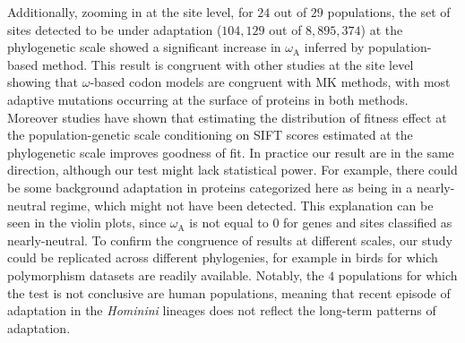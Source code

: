 \documentclass{article}
\begin{document}
    Additionally, zooming in at the site level, for $24$ out of $29$ populations, the set of sites detected to be under adaptation ($104,129$ out of $8,895,374$) at the phylogenetic scale showed a significant increase in $\omega_{\mathrm{A}}$ inferred by population-based method.
    This result is congruent with other studies at the site level showing that $\omega$-based codon models are congruent with MK methods, with most adaptive mutations occurring at the surface of proteins in both methods\cite{moutinho_impact_2019}.
    Moreover studies have shown that estimating the distribution of fitness effect at the population-genetic scale conditioning on SIFT scores estimated at the phylogenetic scale improves goodness of fit\cite{chen_hunting_2021}.
    In practice our result are in the same direction, although our test might lack statistical power.
    For example, there could be some background adaptation in proteins categorized here as being in a nearly-neutral regime, which might not have been detected.
    This explanation can be seen in the violin plots, since $\omega_{\mathrm{A}}$ is not equal to $0$ for genes and sites classified as nearly-neutral.
    To confirm the congruence of results at different scales, our study could be replicated across different phylogenies, for example in birds for which polymorphism datasets are readily available.
    Notably, the $4$ populations for which the test is not conclusive are human populations, meaning that recent episode of adaptation in the \textit{Hominini} lineages does not reflect the long-term patterns of adaptation.
\end{document}
